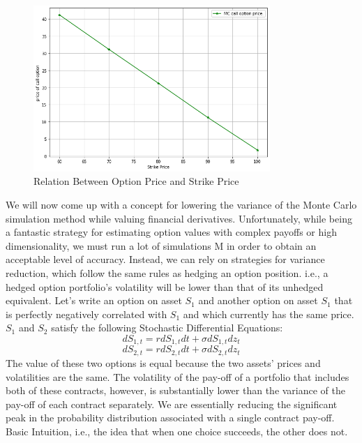 \begin{figure}[H]
	\begin{center}
		\includegraphics[width=0.8\textwidth]{MC_Strike_Price}
	\end{center}
	\caption{Relation Between Option Price and Strike Price}
\end{figure}
\noindent We will now come up with a concept for lowering the variance of the Monte Carlo simulation method while valuing financial derivatives. Unfortunately, while being a fantastic strategy for estimating option values with complex payoffs or high dimensionality, we must run a lot of simulations M in order to obtain an acceptable level of accuracy. Instead, we can rely on strategies for variance reduction, which follow the same rules as hedging an option position. i.e., a hedged option portfolio's volatility will be lower than that of its unhedged equivalent.
\noindent Let’s write an option on asset $S_{1}$
and another option on asset $S_{1}$
that is perfectly negatively correlated with $S_{1}$ and which currently has the same price. $S_{1}$
and $S_{2}$ satisfy the following Stochastic Differential Equations:
$$dS_{1,t}=rdS_{1,t}dt+\sigma dS_{1,t}dz_{t}$$
$$dS_{2,t}=rdS_{2,t}dt+\sigma dS_{2,t}dz_{t}$$
The value of these two options is equal because the two assets' prices and volatilities are the same. The volatility of the pay-off of a portfolio that includes both of these contracts, however, is substantially lower than the variance of the pay-off of each contract separately. We are essentially reducing the significant peak in the probability distribution associated with a single contract pay-off. Basic Intuition, i.e., the idea that when one choice succeeds, the other does not.
